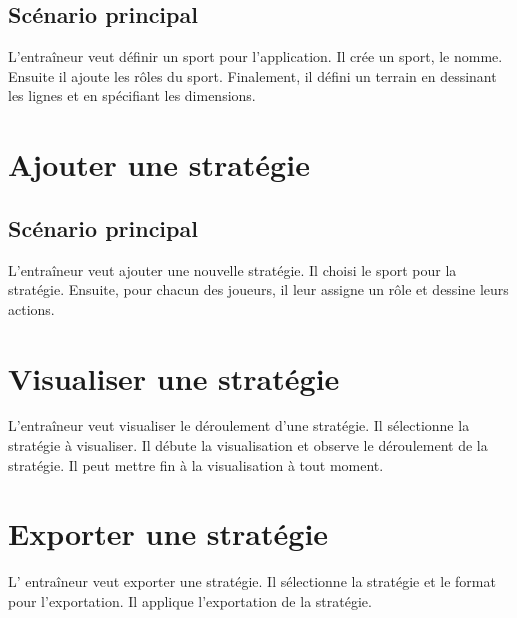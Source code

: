 \subsection{Sc\'enario principal}
\label{sub:sc'enario_principal}

L'entra\^ineur veut définir un sport pour l'application.
Il cr\'ee un sport, le nomme.
Ensuite il ajoute les r\^oles du sport.
Finalement, il d\'efini un terrain en dessinant les lignes et en sp\'ecifiant les dimensions.

\section{Ajouter une stratégie}
\label{sec:ajouter_une_strategie}

\subsection{Sc\'enario principal}
\label{sub:sc'enario_principal}

L'entraîneur veut ajouter une nouvelle stratégie.
Il choisi le sport pour la strat\'egie.
Ensuite, pour chacun des joueurs, il leur assigne un r\^ole et dessine leurs actions.

\section{Visualiser une stratégie}
\label{sec:visualiser_une_strategie}

L'entra\^ineur veut visualiser le d\'eroulement d'une strat\'egie.
Il s\'electionne la strat\'egie \`a visualiser.
Il d\'ebute la visualisation et observe le d\'eroulement de la strat\'egie.
Il peut mettre fin \`a la visualisation \`a tout moment.

\section{Exporter une stratégie}
\label{sec:exporter_une_strategie}

L' entra\^ineur veut exporter une strat\'egie.
Il s\'electionne la strat\'egie et le format pour l'exportation.
Il applique l'exportation de la strat\'egie.

